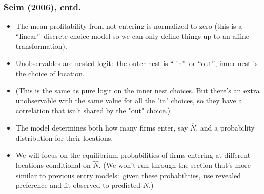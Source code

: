 \documentclass[notes=show]{beamer}
\begin{document}
\begin{frame}%

\frametitle{Seim (2006), cntd.}

\begin{itemize}
\item The mean profitability from not entering is normalized to zero (this
is a \textquotedblleft linear\textquotedblright\ discrete choice model so we
can only define things up to an affine transformation).

\item Unobservables are nested logit:\ the outer nest is \textquotedblleft
in\textquotedblright\ or \textquotedblleft out\textquotedblright , inner
nest is the choice of location.

\item (This is the same as pure logit on the inner nest choices. But there's
an extra unobservable with the same value for all the "in" choices, so they
have a correlation that isn't shared by the "out" choice.)

\item The model determines both how many firms enter, say $\hat{N}$, and a
probability distribution for their locations.

\item We will focus on the equilibrium probabilities of firms entering at
different locations conditional on $\hat{N}$. (We won't run through the
section that's more similar to previous entry models:\ given these
probabilities, use revealed preference and fit observed to predicted $N$.)
\end{itemize}

\end{frame}%
\end{document}
